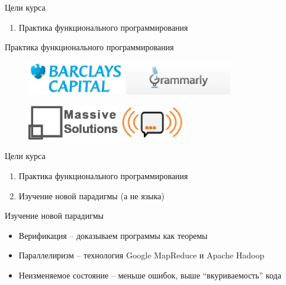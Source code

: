 \documentclass{beamer}
\begin{document}
\begin{frame}{Цели курса}
  \begin{enumerate}
  \item Практика функционального программирования
  \end{enumerate}
\end{frame}

\begin{frame}{Практика функционального программирования}
  \begin{figure}
    \includegraphics[height=15mm]{lecture0/Barcap-logo.eps}
    \includegraphics[height=15mm]{lecture0/logo_grammarly.eps}
  \end{figure}
  \begin{figure}
    \includegraphics[height=15mm]{lecture0/Massive_Solutions.eps}
    \includegraphics[height=15mm]{lecture0/Socialabs.eps}
  \end{figure}
\end{frame}

\begin{frame}{Цели курса}
  \begin{enumerate}
  \item Практика функционального программирования
  \item Изучение новой парадигмы (а не языка)
  \end{enumerate}
\end{frame}

\begin{frame}{Изучение новой парадигмы}
  \begin{itemize}
  \item Верификация -- доказываем программы как теоремы\pause
  \item Параллелиризм -- технология Google MapReduce и Apache Hadoop\pause
  \item Неизменяемое состояние -- меньше ошибок, выше ``вкуриваемость'' кода
  \end{itemize}
\end{frame}
\end{document}
